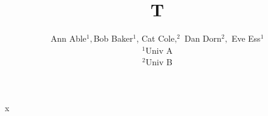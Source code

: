 \documentclass{article}
\begin{document}
\title{T}
\author{Ann Able$^{1}, $Bob Baker$^{1}$, Cat Cole$,^{2}$ Dan Dorn$^{2},$ Eve Ess$^{1}$\\
$^{1}$Univ A\\ $^{2}$Univ B}
\maketitle
x
\end{document}
